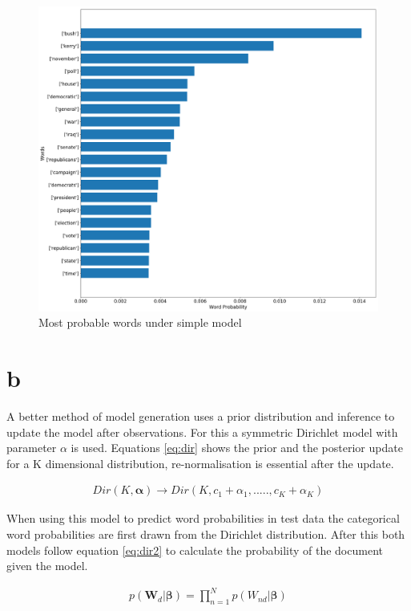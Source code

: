 \documentclass[twoside,twocolumn]{article}
\begin{document}
\begin{figure}[h]
  \centering
    \includegraphics[width=\linewidth]{a_1}
  \caption{Most probable words under simple model}
  \label{fig:a_1}
\end{figure}
\section{b}
A better method of model generation uses a prior distribution and inference to update the model after observations. For this a symmetric Dirichlet model with parameter $\alpha$ is used. Equations \ref{eq:dir} shows the prior and the posterior update for a K dimensional distribution, re-normalisation is essential after the update.

\begin{equation}
\begin{split}
Dir(K, \boldsymbol{\alpha}) \rightarrow Dir(K,c_1+\alpha_1,....., c_K + \alpha_K )
\end{split}
\label{eq:dir}
\end{equation}

When using this model to predict word probabilities in test data the categorical word probabilities are first drawn from the Dirichlet distribution. After this both models follow equation \ref{eq:dir2} to calculate the probability of the document given the model.

\begin{equation}
\begin{split}
p(\textbf{W}_{d}|\boldsymbol{\beta})= \prod_{n=1}^N  p(W_{nd}|\boldsymbol{\beta})
\end{split}
\label{eq:dir2}
\end{equation}
\end{document}
